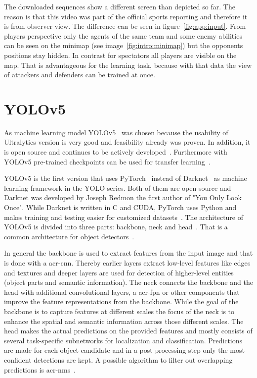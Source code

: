 The downloaded sequences show a different screen than depicted so far. The reason is that 
this video was part of the official sports reporting and therefore it is from observer view. The 
difference can be seen in figure~\ref{fig:app:input}. From players perspective only the agents of the 
same team and some enemy abilities can be seen on the minimap (see 
image~\ref{fig:intro:minimap}) but the opponents positions stay hidden. In contrast for spectators all 
players are visible on the map. That is advantageous for the learning task, because with that data the 
view of attackers and defenders can be trained at once. 

\section{YOLOv5}\label{sec:app:yolov5}

As machine learning model YOLOv5~\cite{jocher2020} was chosen because the usability of 
Ultralytics version is very good and feasibility already was proven. In addition, it is open source and 
continues to be actively developed~\cite{terven2023, river2021}. Furthermore with YOLOv5 
pre-trained checkpoints can be used for transfer learning~\cite{jocher2020}.

YOLOv5 is the first version that uses PyTorch~\cite{pytorch} instead of Darknet~\cite{darknet13} as 
machine learning framework in the YOLO series. Both of them are open source and Darknet was 
developed by Joseph Redmon the first author of "You Only Look Once". While Darknet is 
written in C and CUDA, PyTorch uses Python and makes training and testing easier for customized 
datasets~\cite{darknet13, pytorch, aydin2023, terven2023}. The architecture of YOLOv5 is divided 
into three parts: backbone, neck and head~\cite{archYolov5}. That is a common architecture for 
object detectors~\cite{terven2023}. 

In general the backbone is used to extract features from the input image and that is done with a 
\gls{acr-cnn}. Thereby earlier layers extract low-level features like edges and textures and deeper 
layers are used for detection of higher-level entities (object parts and semantic information). The 
neck connects the backbone and the head with additional convolutional layers, a \gls{acr-fpn} or 
other components that improve the feature representations from the backbone. While the goal of 
the backbone is to capture features at different scales the focus of the neck is to enhance the spatial 
and semantic information across those different scales. The head makes the actual predictions on 
the provided features and mostly consists of several task-specific subnetworks for localization and 
classification. Predictions are made for each object candidate and in a post-processing step only the 
most confident detections are kept. A possible algorithm to filter out overlapping predictions is 
\gls{acr-nms}~\cite{terven2023}.

